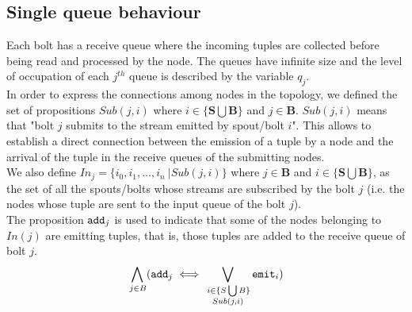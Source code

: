 \newpage
\subsection*{Single queue behaviour}

Each bolt has a receive queue where the incoming tuples are collected before being read and processed by the node.
The queues have infinite size and the level of occupation of each $j^{th}$ queue is described by the variable $q_j$.\\
In order to express the connections among nodes in the topology, we defined the set of propositions $Sub(j,i)$ where $i \in \{ \mathbf{S} \bigcup \mathbf{B}\}$ and $j \in \mathbf{B}$. $Sub(j,i)$ means that "bolt $j$ submits to the stream emitted by spout/bolt $i$". This allows to establish a direct connection between the emission of a tuple by a node and the arrival of the tuple in the receive queues of the submitting nodes.\\
We also define $In_j=\{i_0,i_1, \dots, i_n\ | Sub(j,i) \}$ where $j\in \mathbf{B}$ and $i \in \{ \mathbf{S}\bigcup\mathbf{B}\}$, as the set of all the spouts/bolts whose streams are subscribed by the bolt $j$ (i.e. the nodes whose tuple are sent to the input queue of the bolt $j$).\\
The proposition $\mathtt{add}_{j}$ is used to indicate that some of the nodes belonging to $In(j)$ are emitting tuples, that is, those tuples are added to the receive queue of bolt $j$.
\begin{align*}
 \bigwedge_{
\begin{subarray}{c}
\,j \in B
\end{subarray}
} ( \mathtt{add}_{j} \iff 
\bigvee_{
\begin{subarray}{c}
\,i \in \{S \bigcup B \}\\
Sub(j,i)
\end{subarray}
 } \mathtt{emit}_{i})
\end{align*}
